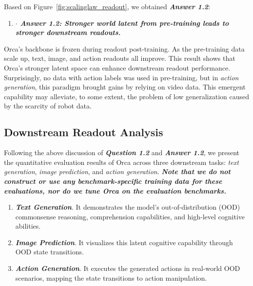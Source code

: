 \documentclass{llmxive}
\begin{document}
Based on Figure~\ref{fig:scalinglaw_readout}, we obtained \textbf{\textit{Answer 1.2}}:

\vspace{-1ex}
\begin{enumerate}[label={}, leftmargin=10pt, itemindent=0pt, itemsep=0.3em, topsep=0.3em]
\item[] \textit{\textbf{$\cdot$ Answer 1.2: Stronger world latent from pre-training leads to stronger downstream readouts.}} 
\end{enumerate}

Orca's backbone is frozen during readout post-training. As the pre-training data scale up, text, image, and action readouts all improve. This result shows that Orca's stronger latent space can enhance downstream readout performance. Surprisingly, no data with action labels was used in pre-training, but in \textit{action generation}, this paradigm brought gains by relying on video data. This emergent capability may alleviate, to some extent, the problem of low generalization caused by the scarcity of robot data.


\subsection{Downstream Readout Analysis}

Following the above discussion of \textbf{\textit{Question 1.2}} and \textbf{\textit{Answer 1.2}}, we present the quantitative evaluation results of Orca across three downstream tasks: \textit{text generation}, \textit{image prediction}, and \textit{action generation}. \textbf{\textit{Note that we do not construct or use any benchmark-specific training data for these evaluations, nor do we tune Orca on the evaluation benchmarks.}}



\vspace{-2ex}
\begin{enumerate}
    \item \textbf{\textit{Text Generation}}. It demonstrates the model's out-of-distribution (OOD) commonsense reasoning, comprehension capabilities, and high-level cognitive abilities.
    \item \textbf{\textit{Image Prediction}}. It visualizes this latent cognitive capability through OOD state transitions.
    \item \textit{\textbf{Action Generation}}. It executes the generated actions in real-world OOD scenarios, mapping the state transitions to action manipulation.
\end{enumerate}
\end{document}
